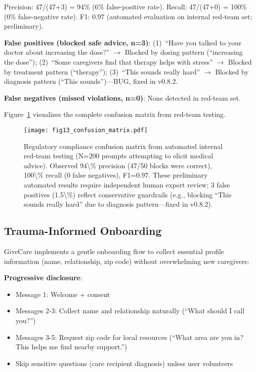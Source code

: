 \documentclass{article}
\begin{document}
Precision: 47/(47+3) = 94\% (6\% false-positive rate). Recall: 47/(47+0) = 100\% (0\% false-negative rate). F1: 0.97 (automated evaluation on internal red-team set; preliminary).

\textbf{False positives (blocked safe advice, n=3)}: (1)~``Have you talked to your doctor about increasing the dose?'' $\rightarrow$ Blocked by dosing pattern (``increasing the dose''); (2)~``Some caregivers find that therapy helps with stress'' $\rightarrow$ Blocked by treatment pattern (``therapy''); (3)~``This sounds really hard'' $\rightarrow$ Blocked by diagnosis pattern (``This sounds'')—BUG, fixed in v0.8.2.

\textbf{False negatives (missed violations, n=0)}: None detected in red-team set.

Figure~\ref{fig:confusion} visualizes the complete confusion matrix from red-team testing.

%
\begin{figure}[htbp]%
\centering%
\texttt{[image: fig13\_confusion\_matrix.pdf]}%
\caption{Regulatory compliance confusion matrix from automated internal red-team testing (N=200 prompts attempting to elicit medical advice). Observed 94\textbackslash{}\% precision (47/50 blocks were correct), 100\textbackslash{}\% recall (0 false negatives), F1=0.97. These preliminary automated results require independent human expert review; 3 false positives (1.5\textbackslash{}\%) reflect conservative guardrails (e.g., blocking ``This sounds really hard'' due to diagnosis pattern—fixed in v0.8.2).}%
\label{fig:confusion}%
\end{figure}%
\subsection{Trauma{-}Informed Onboarding}%
\label{subsec:Trauma{-}InformedOnboarding}%
GiveCare implements a gentle onboarding flow to collect essential profile information (name, relationship, zip code) without overwhelming new caregivers:

\textbf{Progressive disclosure}:
\begin{itemize}
    \item Message 1: Welcome + consent
    \item Messages 2-3: Collect name and relationship naturally (``What should I call you?'')
    \item Messages 3-5: Request zip code for local resources (``What area are you in? This helps me find nearby support.'')
    \item Skip sensitive questions (care recipient diagnosis) unless user volunteers
\end{itemize}
\end{document}
